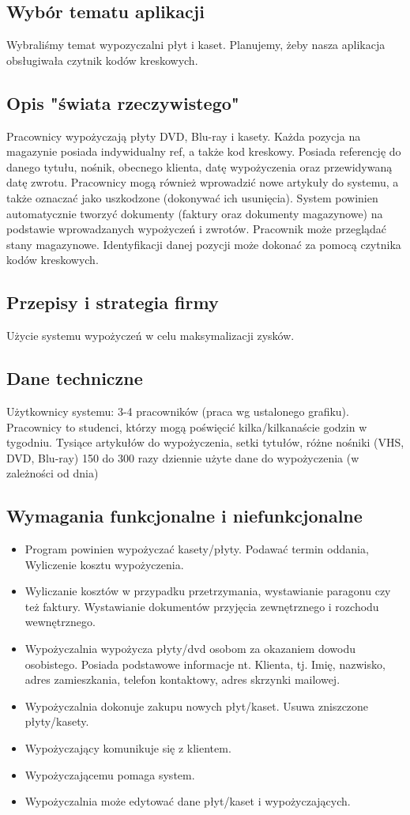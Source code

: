 \documentclass{article}
\begin{document}
\subsection{Wybór tematu aplikacji}
Wybraliśmy temat wypozyczalni płyt i kaset. Planujemy, żeby nasza aplikacja obsługiwała czytnik kodów kreskowych.

\subsection{Opis "świata rzeczywistego"}
Pracownicy wypożyczają płyty DVD, Blu-ray i kasety. Każda pozycja na magazynie posiada indywidualny ref, a także kod kreskowy. Posiada referencję do danego tytułu, nośnik, obecnego klienta, datę wypożyczenia oraz przewidywaną datę zwrotu. Pracownicy mogą również wprowadzić nowe artykuły do systemu, a także oznaczać jako uszkodzone (dokonywać ich usunięcia). System powinien automatycznie tworzyć dokumenty (faktury oraz dokumenty magazynowe) na podstawie wprowadzanych wypożyczeń i zwrotów. Pracownik może przeglądać stany magazynowe. Identyfikacji danej pozycji może dokonać za pomocą czytnika kodów kreskowych.

\subsection{Przepisy i strategia firmy}
Użycie systemu wypożyczeń w celu maksymalizacji zysków.

\subsection{Dane techniczne}
Użytkownicy systemu: 3-4 pracowników (praca wg ustalonego grafiku).
Pracownicy to studenci, którzy mogą poświęcić kilka/kilkanaście godzin w tygodniu. 
Tysiące artykułów do wypożyczenia, setki tytułów, różne nośniki (VHS, DVD, Blu-ray)
150 do 300 razy dziennie użyte dane do wypożyczenia (w zależności od dnia)

\subsection{Wymagania funkcjonalne i niefunkcjonalne}
\begin{itemize}
\item Program powinien wypożyczać kasety/płyty. Podawać termin oddania, Wyliczenie kosztu wypożyczenia. 
\item Wyliczanie kosztów w przypadku przetrzymania, wystawianie paragonu czy też faktury. Wystawianie dokumentów przyjęcia zewnętrznego i rozchodu wewnętrznego.
\item Wypożyczalnia wypożycza płyty/dvd osobom za okazaniem dowodu osobistego. Posiada podstawowe informacje nt. Klienta, tj. Imię, nazwisko, adres zamieszkania, telefon kontaktowy, adres skrzynki mailowej.
\item Wypożyczalnia dokonuje zakupu nowych płyt/kaset. Usuwa zniszczone płyty/kasety. 
\item Wypożyczający komunikuje się z klientem. 
\item Wypożyczającemu pomaga system.
\item Wypożyczalnia może edytować dane płyt/kaset i wypożyczających.
\end{itemize}
\end{document}
